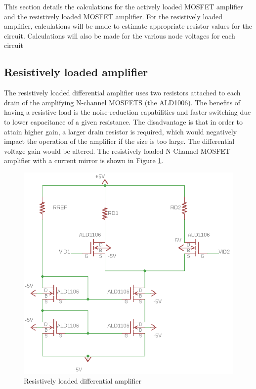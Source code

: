 


This section details the calculations for the actively loaded MOSFET amplifier and the resistively loaded MOSFET amplifier. For the resistively loaded amplifier, calculations will be made to estimate appropriate resistor values for the circuit. Calculations will also be made for the various node voltages for each circuit

\subsection{Resistively loaded amplifier}

The resistively loaded differential amplifier uses two resistors attached to each drain of the amplifying N-channel MOSFETS (the ALD1006). The benefits of having a resistive load is the noise-reduction capabilities and faster switching due to lower capacitance of a given resistance. The disadvantage is that in order to attain higher gain, a larger drain resistor is required, which would negatively impact the operation of the amplifier if the size is too large. The differential voltage gain would be altered. The resistively loaded N-Channel MOSFET amplifier with a current mirror is shown in Figure \ref{fig:resistiveloadedgeneral}. 

\begin{figure}[H]
    \begin{center}
    \includegraphics[scale=.85]{CircuitDevelopment/GenrealResLoaded.png}
    \caption{Resistively loaded differential amplifier}
    \label{fig:resistiveloadedgeneral}
    \end{center}
    
\end{figure}

